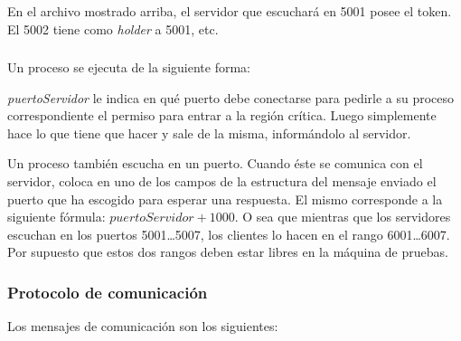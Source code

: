 En el archivo mostrado arriba, el servidor que escuchará en 5001 posee el token.
El 5002 tiene como \emph{holder} a 5001, etc.


\subsubsection{}

Un proceso  se ejecuta de la siguiente forma:


\emph{puertoServidor} le indica en qué puerto debe conectarse para pedirle a su
proceso  correspondiente el permiso para entrar a la región
crítica. Luego simplemente hace lo que tiene que hacer y sale de la misma,
informándolo al servidor.

Un proceso  también escucha en un puerto. Cuando éste se
comunica con el servidor, coloca en uno de los campos de la estructura del
mensaje enviado el puerto que ha escogido para esperar una respuesta. El
mismo corresponde a la siguiente fórmula: $puertoServidor + 1000$. O sea que
mientras que los servidores escuchan en los puertos 5001\ldots5007, los clientes
lo hacen en el rango 6001\ldots6007. Por supuesto que estos dos rangos deben
estar libres en la máquina de pruebas.


\subsubsection{Protocolo de comunicación}

Los mensajes de comunicación son los siguientes:

